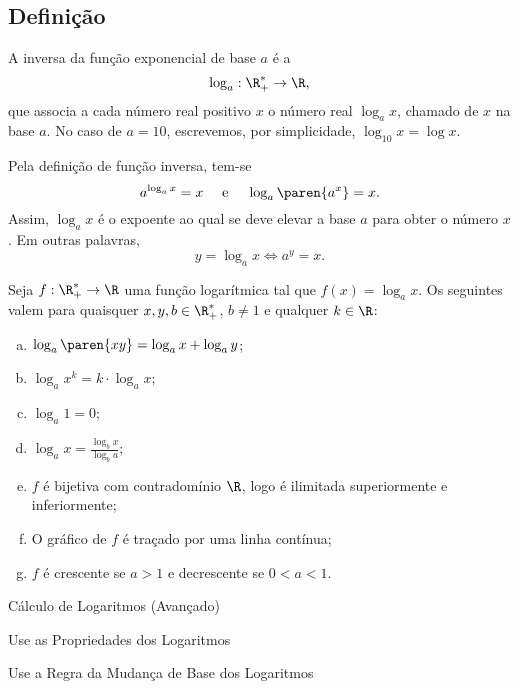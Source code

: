 \subsection{Definição}

\begin{definition}
A inversa da função exponencial de base $a$ é a 
$$\log_a : \R_+^* \to \R,$$
que associa a cada número real positivo $x$ o número real $\log_a
x$, chamado  de $x$ na base $a$. No caso de $a=10$,
escrevemos, por simplicidade, $\log_{10}x = \log x$.
\end{definition}

\begin{remark}
    Pela definição de função inversa, tem-se
$$ a^{\log_a x}=x \ \ \ \text{ e } \ \ \ \log_a \paren{a^x} = x.$$
Assim, $\log_a x $ é o expoente ao qual se deve elevar a base $a$
para obter o número $x$. Em outras palavras,
$$ y = \log_a x \iff a^y = x.$$
\end{remark}

\begin{proposition}
    Seja $f: \R_+^* \to \R$ uma função logarítmica tal que $f(x) =
\log_a x$. Os seguintes valem para quaisquer  $x, y, b \in
\R_+^*$, $b \neq 1$ e qualquer $k \in \R$:
\begin{enumerate}[(a)]
  \item $\log_a \paren{xy} = \log_a x + \log_a y$;
  \item $\log_a x^k = k\cdot \log_a x$;
  \item $\log_a 1 = 0$;
  \item $\log_a x = \frac{\log_b x}{\log_b a}$;
  \item $f$ é bijetiva com contradomínio $\R$, logo é ilimitada superiormente e inferiormente;
  \item O gráfico de $f$ é traçado por uma linha contínua;
  \item $f$ é crescente se $a>1$ e decrescente se $0<a<1$.
\end{enumerate}
\end{proposition}

\begin{onlineact}
    {Cálculo de Logaritmos (Avançado)}
\end{onlineact}

\begin{onlineact}
    {Use as Propriedades dos Logaritmos}
\end{onlineact}

\begin{onlineact}
    {Use a Regra da Mudança de Base dos Logaritmos}
\end{onlineact}

